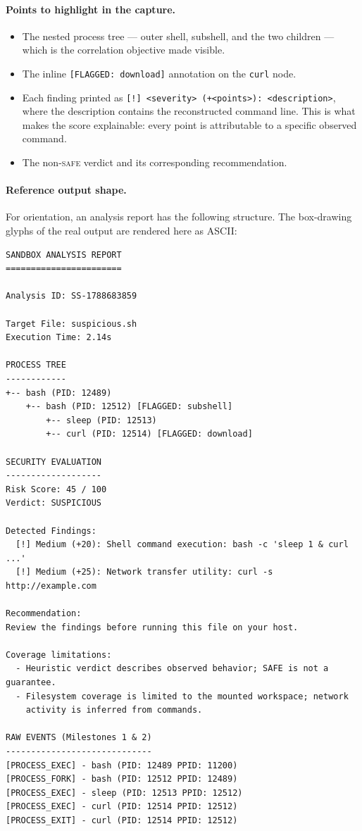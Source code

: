\documentclass[11pt,a4paper]{article}
\newcommand{\code}[1]{\texttt{\small #1}}
\begin{document}
\paragraph{Points to highlight in the capture.}
\begin{itemize}[leftmargin=*,itemsep=1pt]
  \item The nested process tree --- outer shell, subshell, and the two children ---
        which is the correlation objective made visible.
  \item The inline \code{[FLAGGED: download]} annotation on the \code{curl} node.
  \item Each finding printed as
        \code{[!] <severity> (+<points>): <description>}, where the description
        contains the reconstructed command line. This is what makes the score
        explainable: every point is attributable to a specific observed command.
  \item The non-\textsc{safe} verdict and its corresponding recommendation.
\end{itemize}

\paragraph{Reference output shape.} For orientation, an analysis report has the
following structure. The box-drawing glyphs of the real output are rendered here as
ASCII:

\begin{lstlisting}[style=term]
SANDBOX ANALYSIS REPORT
=======================

Analysis ID: SS-1788683859

Target File: suspicious.sh
Execution Time: 2.14s

PROCESS TREE
------------
+-- bash (PID: 12489)
    +-- bash (PID: 12512) [FLAGGED: subshell]
        +-- sleep (PID: 12513)
        +-- curl (PID: 12514) [FLAGGED: download]

SECURITY EVALUATION
-------------------
Risk Score: 45 / 100
Verdict: SUSPICIOUS

Detected Findings:
  [!] Medium (+20): Shell command execution: bash -c 'sleep 1 & curl ...'
  [!] Medium (+25): Network transfer utility: curl -s http://example.com

Recommendation:
Review the findings before running this file on your host.

Coverage limitations:
  - Heuristic verdict describes observed behavior; SAFE is not a guarantee.
  - Filesystem coverage is limited to the mounted workspace; network
    activity is inferred from commands.

RAW EVENTS (Milestones 1 & 2)
-----------------------------
[PROCESS_EXEC] - bash (PID: 12489 PPID: 11200)
[PROCESS_FORK] - bash (PID: 12512 PPID: 12489)
[PROCESS_EXEC] - sleep (PID: 12513 PPID: 12512)
[PROCESS_EXEC] - curl (PID: 12514 PPID: 12512)
[PROCESS_EXIT] - curl (PID: 12514 PPID: 12512)
\end{lstlisting}
\end{document}
